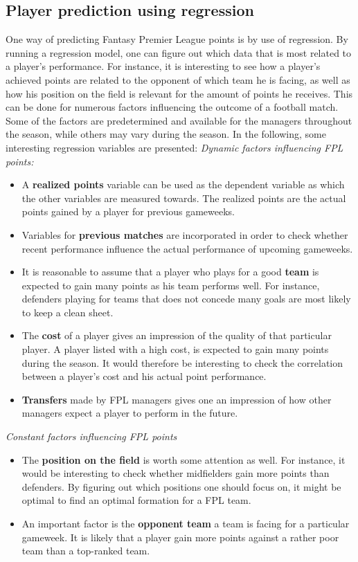 \subsection{Player prediction using regression}
One way of predicting Fantasy Premier League points is by use of regression. By running a regression model, one can figure out which data that is most related to a player's performance. For instance, it is interesting to see how a player's achieved points are related to the opponent of which team he is facing, as well as how his position on the field is relevant for the amount of points he receives. This can be done for numerous factors influencing the outcome of a football match. Some of the factors are predetermined and available for the managers throughout the season, while others may vary during the season. In the following, some interesting regression variables are presented: 
\newpar
\textit{Dynamic factors influencing FPL points:}
\newpar
\begin{itemize}
    \item A \textbf{realized points} variable can be used as the dependent variable as which the other variables are measured towards. The realized points are the actual points gained by a player for previous gameweeks.
    \item Variables for \textbf{previous matches} are incorporated in order to check whether recent performance influence the actual performance of upcoming gameweeks.
    \item It is reasonable to assume that a player who plays for a good \textbf{team} is expected to gain many points as his team performs well. For instance, defenders playing for teams that does not concede many goals are most likely to keep a clean sheet.
    \item The \textbf{cost} of a player gives an impression of the quality of that particular player. A player listed with a high cost, is expected to gain many points during the season. It would therefore be interesting to check the correlation between a player's cost and his actual point performance. 
    \item \textbf{Transfers} made by FPL managers gives one an impression of how other managers expect a player to perform in the future.
    \end{itemize}
\newpar
\textit{Constant factors influencing FPL points}
\newpar
\begin{itemize}
    \item The \textbf{position on the field} is worth some attention as well. For instance, it would be interesting to check whether midfielders gain more points than defenders. By figuring out which positions one should focus on, it might be optimal to find an optimal formation for a FPL team.
    \item An important factor is the \textbf{opponent team} a team is facing for a particular gameweek. It is likely that a player gain more points against a rather poor team than a top-ranked team. 
\end{itemize}





